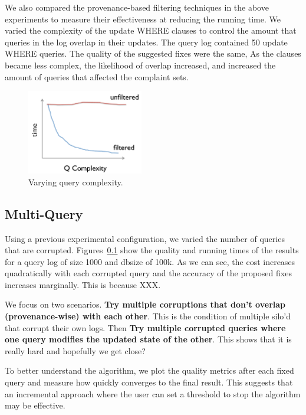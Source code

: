 We also compared the provenance-based filtering techniques in the above experiments
to measure their effectiveness at reducing the running time.  We varied the complexity of the update 
WHERE clauses to control the amount that queries in the log overlap in their updates.  The query log contained 50 update WHERE queries.
The quality of the suggested fixes were the same,  As the clauses became less complex, the likelihood 
of overlap increased, and increased the amount of queries that affected the complaint sets.


\begin{figure}[h]
\centering
\includegraphics[width = 2in]{figures/complete_qfilter_complexity}
\caption{Varying query complexity.}
\label{f:complete_qfilter_complexity} 
\end{figure}



\subsection{Multi-Query}

Using a previous experimental configuration, we varied the number of queries that are corrupted.  Figures~\ref{}
show the quality and running times of the results for a query log of size 1000 and dbsize of 100k.  
As we can see, the cost increases quadratically with each corrupted query and the accuracy of the proposed fixes increases marginally.  
This is because XXX.

We focus on two scenarios.  {\bf Try multiple corruptions that don't overlap (provenance-wise) with each other}.  This is the condition of multiple silo'd that
corrupt their own logs.  Then {\bf Try multiple corrupted queries where one query modifies the updated state of the other}.  This shows that
it is really hard and hopefully we get close?



To better understand the algorithm, we plot the quality metrics after each fixed query and measure how quickly \sys converges to the final result. 
This suggests that an incremental approach where the user can set a threshold to stop the algorithm may be effective.



